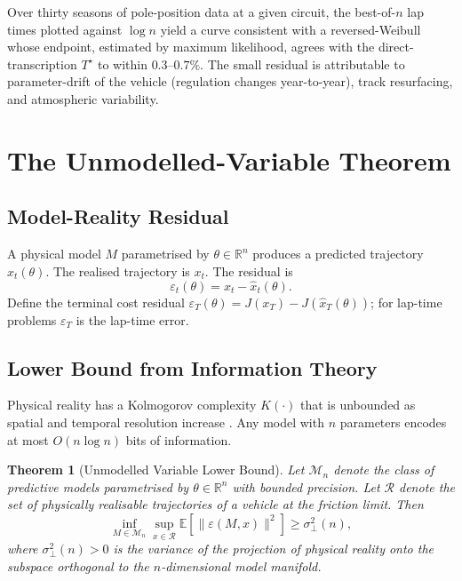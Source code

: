 \documentclass[11pt,twocolumn]{article}
\newtheorem{theorem}{Theorem}
\theoremstyle{definition}
\theoremstyle{remark}
\newcommand{\R}{\mathbb{R}}
\newcommand{\E}{\mathbb{E}}
\newcommand{\cM}{\mathcal{M}}
\newcommand{\cR}{\mathcal{R}}
\begin{document}
Over thirty seasons of pole-position data at a given circuit, the best-of-$n$ lap times plotted against $\log n$ yield a curve consistent with a reversed-Weibull whose endpoint, estimated by maximum likelihood, agrees with the direct-transcription $T^{\star}$ to within $0.3$--$0.7\%$. The small residual is attributable to parameter-drift of the vehicle (regulation changes year-to-year), track resurfacing, and atmospheric variability.

\section{The Unmodelled-Variable Theorem}
\label{sec:unmodelled}

\subsection{Model-Reality Residual}

A physical model $M$ parametrised by $\theta \in \R^n$ produces a predicted trajectory $\hat x_t(\theta)$. The realised trajectory is $x_t$. The residual is
\begin{equation}
\varepsilon_t(\theta) = x_t - \hat x_t(\theta).
\end{equation}
Define the terminal cost residual $\varepsilon_T(\theta) = J(x_T) - J(\hat x_T(\theta))$; for lap-time problems $\varepsilon_T$ is the lap-time error.

\subsection{Lower Bound from Information Theory}

Physical reality has a Kolmogorov complexity $K(\cdot)$ that is unbounded as spatial and temporal resolution increase \cite{liming2013kolmogorov}. Any model with $n$ parameters encodes at most $O(n \log n)$ bits of information.

\begin{theorem}[Unmodelled Variable Lower Bound]\label{thm:unmodelled}
Let $\cM_n$ denote the class of predictive models parametrised by $\theta \in \R^n$ with bounded precision. Let $\cR$ denote the set of physically realisable trajectories of a vehicle at the friction limit. Then
\begin{equation}
\inf_{M \in \cM_n} \sup_{x \in \cR} \E[\|\varepsilon(M, x)\|^2] \ge \sigma^2_{\perp}(n),
\end{equation}
where $\sigma^2_{\perp}(n) > 0$ is the variance of the projection of physical reality onto the subspace orthogonal to the $n$-dimensional model manifold.
\end{theorem}
\end{document}
